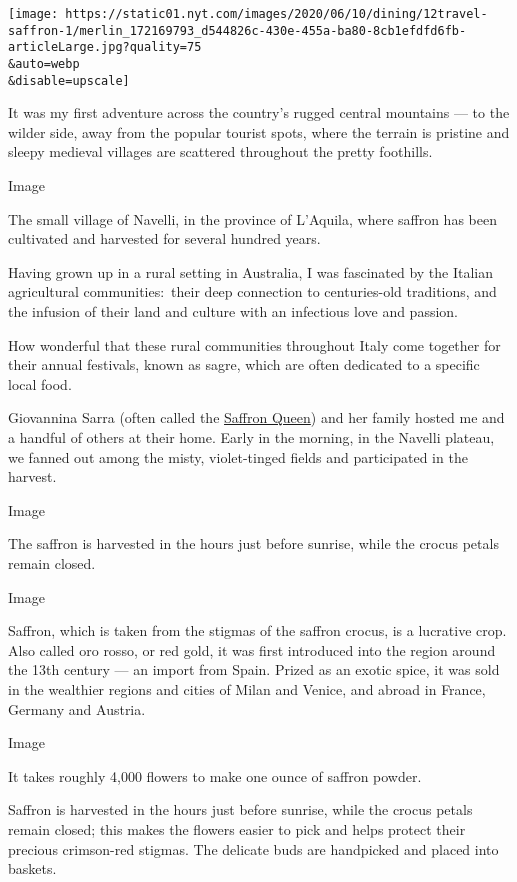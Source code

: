 \texttt{[image: https://static01.nyt.com/images/2020/06/10/dining/12travel-saffron-1/merlin\_172169793\_d544826c-430e-455a-ba80-8cb1efdfd6fb-articleLarge.jpg?quality=75\\\&auto=webp\\\&disable=upscale]}

It was my first adventure across the country's rugged central mountains
--- to the wilder side, away from the popular tourist spots, where the
terrain is pristine and sleepy medieval villages are scattered
throughout the pretty foothills.

Image

The small village of Navelli, in the province of L'Aquila, where saffron
has been cultivated and harvested for several hundred years.

Having grown up in a rural setting in Australia, I was fascinated by the
Italian agricultural communities:~their deep connection to centuries-old
traditions, and the infusion of their land and culture with an
infectious love and passion.

How wonderful that these rural communities throughout Italy come
together for their annual festivals, known as sagre, which are often
dedicated to a specific local food.

Giovannina Sarra (often called the
\href{https://www.lifeinabruzzo.com/navelli-saffron-queen-the-power-bling/}{Saffron
Queen}) and her family hosted me and a handful of others at their home.
Early in the morning, in the Navelli plateau, we fanned out among the
misty, violet-tinged fields and participated in the harvest.

Image

The saffron is harvested in the hours just before sunrise, while the
crocus petals remain closed.

Image

Saffron, which is taken from the stigmas of the saffron crocus, is a
lucrative crop. Also called oro rosso, or red gold, it was first
introduced into the region around the 13th century --- an import from
Spain. Prized as an exotic spice, it was sold in the wealthier regions
and cities of Milan and Venice, and abroad in France, Germany and
Austria.

Image

It takes roughly 4,000 flowers to make one ounce of saffron powder.

Saffron is harvested in the hours just before sunrise, while the crocus
petals remain closed; this makes the flowers easier to pick and helps
protect their precious crimson-red stigmas. The delicate buds are
handpicked and placed into baskets.

